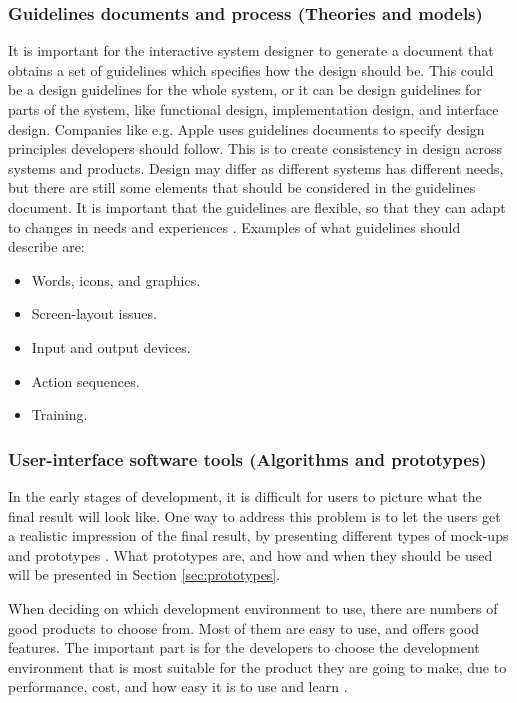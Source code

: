 \subsubsection{Guidelines documents and process (Theories and models)}
It is important for the interactive system designer to generate a document that obtains a set of guidelines which specifies how the design should be. This could be a design guidelines for the whole system, or it can be design guidelines for parts of the system, like functional design, implementation design, and interface design. Companies like e.g. Apple uses guidelines documents to specify design principles developers should follow. This is to create consistency in design across systems and products. Design may differ as different systems has different needs, but there are still some elements that should be considered in the guidelines document. It is important that the guidelines are flexible, so that they can adapt to changes in needs and experiences \cite{mmi}. Examples of what guidelines should describe are:

\begin{itemize}
\renewcommand{\labelitemi}{$\bullet$}
\item Words, icons, and graphics.
\item Screen-layout issues.
\item Input and output devices.
\item Action sequences.
\item Training.
\end{itemize}

\subsubsection{User-interface software tools (Algorithms and prototypes)}
In the early stages of development, it is difficult for users to picture what the final result will look like. One way to address this problem is to let the users get a realistic impression of the final result, by presenting different types of mock-ups and prototypes \cite{mmi}. What prototypes are, and how and when they should be used will be presented in Section \ref{sec:prototypes}. 

When deciding on which development environment to use, there are numbers of good products to choose from. Most of them are easy to use, and offers good features. The important part is for the developers to choose the development environment that is most suitable for the product they are going to make, due to performance, cost, and how easy it is to use and learn \cite{mmi}.
	
